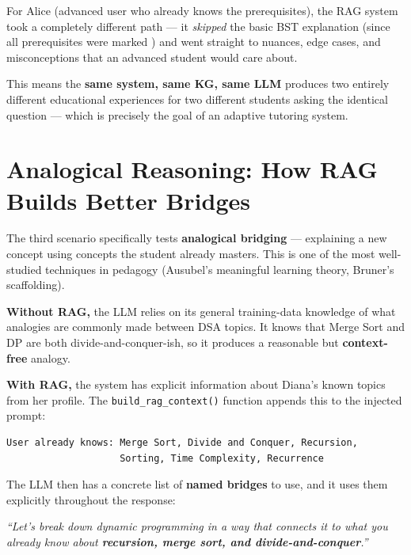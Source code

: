 \documentclass[12pt,a4paper]{article}
\newenvironment{quotebox}{%
  \begin{tcolorbox}[
    colback=quotebg,
    colframe=quoteborder,
    left=6pt, right=6pt, top=4pt, bottom=4pt,
    boxrule=0.5pt,
    leftrule=3pt,
    arc=2pt,
    breakable,
  ]
  \itshape\small
}{%
  \end{tcolorbox}
}
\newcommand{\tick}{\textcolor{darkgreen}{\ding{51}}}
\begin{document}
For Alice (advanced user who already knows the prerequisites), the RAG system
took a completely different path --- it \textit{skipped} the basic BST
explanation (since all prerequisites were marked \tick) and went straight to
nuances, edge cases, and misconceptions that an advanced student would care
about.

This means the \textbf{same system, same KG, same LLM} produces two entirely
different educational experiences for two different students asking the identical
question --- which is precisely the goal of an adaptive tutoring system.

\section{Analogical Reasoning: How RAG Builds Better Bridges}

The third scenario specifically tests \textbf{analogical bridging} --- explaining
a new concept using concepts the student already masters. This is one of the
most well-studied techniques in pedagogy (Ausubel's meaningful learning theory,
Bruner's scaffolding).

\textbf{Without RAG,} the LLM relies on its general training-data knowledge of
what analogies are commonly made between DSA topics. It knows that Merge Sort
and DP are both divide-and-conquer-ish, so it produces a reasonable but
\textbf{context-free} analogy.

\textbf{With RAG,} the system has explicit information about Diana's known topics
from her profile. The \texttt{build\_rag\_context()} function appends this to the
injected prompt:

\begin{lstlisting}
User already knows: Merge Sort, Divide and Conquer, Recursion,
                    Sorting, Time Complexity, Recurrence
\end{lstlisting}

The LLM then has a concrete list of \textbf{named bridges} to use, and it uses
them explicitly throughout the response:

\begin{quotebox}
\textit{``Let's break down dynamic programming in a way that connects it to what
you already know about \textbf{recursion, merge sort, and divide-and-conquer}.''}
\end{quotebox}
\end{document}

